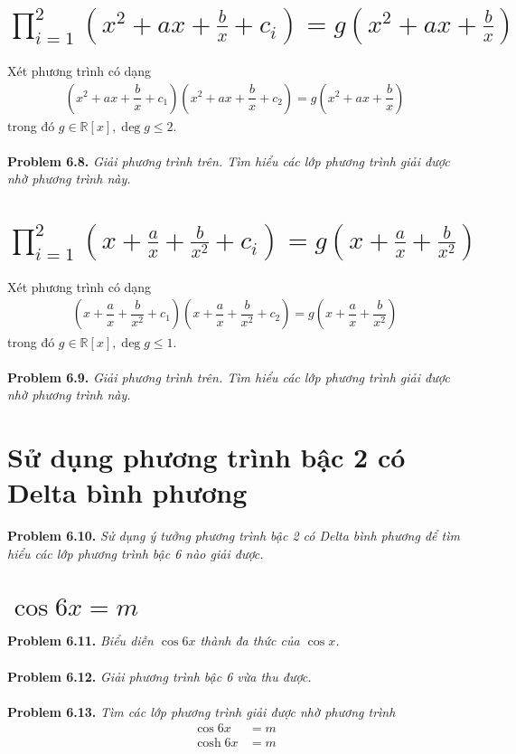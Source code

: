 \documentclass[a4paper,oneside]{book}
\numberwithin{equation}{chapter}
\begin{document}
\section{$\prod\limits_{i = 1}^2 {\left( {{x^2} + ax + \frac{b}{x} + {c_i}} \right)}  = g\left( {{x^2} + ax + \frac{b}{x}} \right)$}
Xét phương trình có dạng 
\begin{align}
\left( {{x^2} + ax + \dfrac{b}{x} + {c_1}} \right)\left( {{x^2} + ax + \dfrac{b}{x} + {c_2}} \right) = g\left( {{x^2} + ax + \dfrac{b}{x}} \right)
\end{align}
trong đó $g \in \mathbb{R} \left[ x \right],\deg g \le 2$.\\
\\
\textbf{Problem 6.8.} \textit{Giải phương trình trên. Tìm hiểu các lớp phương trình giải được nhờ phương trình này.}
\section{$\prod\limits_{i = 1}^2 {\left( {x + \frac{a}{x} + \frac{b}{{{x^2}}} + {c_i}} \right)}  = g\left( {x + \frac{a}{x} + \frac{b}{{{x^2}}}} \right)$}
Xét phương trình có dạng
\begin{align}
\left( {x + \dfrac{a}{x} + \dfrac{b}{{{x^2}}} + {c_1}} \right)\left( {x + \dfrac{a}{x} + \dfrac{b}{{{x^2}}} + {c_2}} \right) = g\left( {x + \dfrac{a}{x} + \dfrac{b}{{{x^2}}}} \right)
\end{align}
trong đó $g \in \mathbb{R} \left[ x \right],\deg g \le 1$.\\
\\
\textbf{Problem 6.9.} \textit{Giải phương trình trên. Tìm hiểu các lớp phương trình giải được nhờ phương trình này.}
\section{Sử dụng phương trình bậc 2 có Delta bình phương}
\textbf{Problem 6.10.} \textit{Sử dụng ý tưởng phương trình bậc 2 có Delta bình phương để tìm hiểu các lớp phương trình bậc 6 nào giải được.}
\section{$\cos 6x = m$}
\textbf{Problem 6.11.} \textit{Biểu diễn $\cos 6x$ thành đa thức của $\cos x$.}\\
\\
\textbf{Problem 6.12.} \textit{Giải phương trình bậc 6 vừa thu được.}\\
\\
\textbf{Problem 6.13.} \textit{Tìm các lớp phương trình giải được nhờ phương trình}
\begin{align}
\cos 6x &= m\\
\cosh 6x &= m
\end{align}
\end{document}
